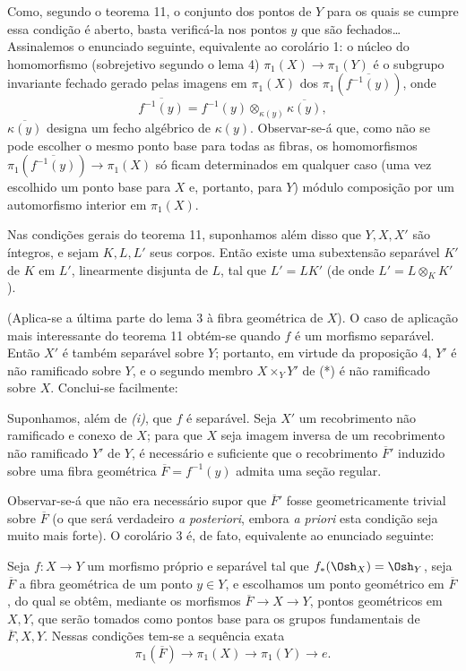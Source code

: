 Como, segundo o teorema 11, o conjunto dos pontos de $Y$ para os quais se
cumpre essa condição é aberto, basta verificá-la nos pontos $y$ que são
fechados\ldots{} Assinalemos o enunciado seguinte, equivalente ao corolário 1:
o núcleo do homomorfismo (sobrejetivo segundo o lema 4)
$\pi_1(X)\longrightarrow\pi_1(Y)$ é o subgrupo invariante fechado gerado
pelas imagens em $\pi_1(X)$ dos $\pi_1(\overline{f^{-1}(y)})$, onde
\[
  \overline{f^{-1}(y)}
  =f^{-1}(y)\otimes_{\kappa(y)}\overline{\kappa(y)},
\]
$\overline{\kappa(y)}$ designa um fecho algébrico de $\kappa(y)$. Observar-se-á
que, como não se pode escolher o mesmo ponto base para todas as fibras,
os homomorfismos $\pi_1(\overline{f^{-1}(y)})\longrightarrow\pi_1(X)$ só
ficam determinados em qualquer caso (uma vez escolhido um ponto base para $X$
e, portanto, para $Y$) módulo composição por um automorfismo interior em
$\pi_1(X)$.

 Nas condições gerais do teorema 11, suponhamos
além disso que $Y,X,X'$ são íntegros, e sejam $K,L,L'$ seus corpos. Então existe
uma subextensão separável $K'$ de $K$ em $L'$, linearmente disjunta de $L$, tal
que $L'=LK'$ (de onde $L'=L\otimes_K K'$).

(Aplica-se a última parte do lema 3 à fibra geométrica de $X$). O caso de
aplicação mais interessante do teorema 11 obtém-se quando $f$ é um morfismo
separável. Então $X'$ é também separável sobre $Y$; portanto, em virtude
da proposição 4, $Y'$ é não ramificado sobre $Y$, e o segundo membro
$X\times_Y Y'$ de (*) é não ramificado sobre $X$. Conclui-se facilmente:

 Suponhamos, além de \textit{(i)}, que $f$ é separável.
Seja $X'$ um recobrimento não ramificado e conexo de $X$; para que
$X$ seja imagem inversa de um
recobrimento não ramificado $Y'$ de $Y$, é necessário e suficiente que o
recobrimento $\overline F'$ induzido sobre uma fibra geométrica
$\overline F=f^{-1}(y)$ admita uma seção regular.

Observar-se-á que não era necessário supor que $\overline F'$ fosse
geometricamente trivial sobre $\overline F$ (o que será verdadeiro \textit{a
posteriori}, embora \textit{a priori} esta condição seja muito mais forte). O
corolário 3 é, de fato, equivalente ao enunciado seguinte:

 Seja $f:X\longrightarrow Y$ um morfismo próprio e separável
tal que $f_*(\Osh_X)=\Osh_Y$, seja $\overline F$ a fibra geométrica de um ponto
$y\in Y$, e escolhamos um ponto geométrico em $\overline F$, do qual se obtêm,
mediante os morfismos $\overline F\longrightarrow X\longrightarrow Y$, pontos
geométricos em $X,Y$, que serão tomados como pontos base para os grupos
fundamentais de $\overline F,X,Y$. Nessas condições tem-se a sequência
exata
\[
  \boxed{
    \pi_1(\overline F)\longrightarrow\pi_1(X)
    \longrightarrow\pi_1(Y)\longrightarrow e
  }.
\]

